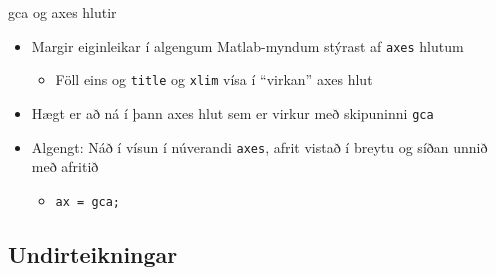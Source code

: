 \documentclass[handout]{beamer}
\begin{document}
\begin{frame}{gca og axes hlutir}
    \begin{itemize}
        \item Margir eiginleikar í algengum Matlab-myndum stýrast af \texttt{axes} hlutum
        \begin{itemize}
            \item Föll eins og \texttt{title} og \texttt{xlim} vísa í ``virkan'' axes hlut
        \end{itemize}
        \item Hægt er að ná í þann axes hlut sem er virkur með skipuninni \texttt{gca}
        \item Algengt: Náð í vísun í núverandi \texttt{axes}, afrit vistað í breytu og síðan unnið með afritið
        \begin{itemize}
            \item \texttt{ax = gca;}
        \end{itemize}
    \end{itemize}
\end{frame}

\subsection{Undirteikningar}
\end{document}
